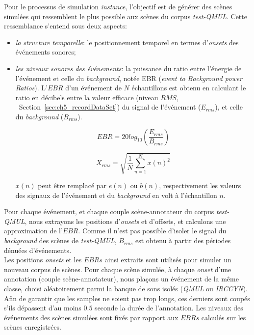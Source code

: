 Pour le processus de simulation \emph{instance}, l'objectif est de générer des scènes simulées qui ressemblent le plus possible aux scènes du corpus \emph{test-QMUL}. Cette ressemblance s'entend sous deux aspects:

\begin{itemize}
\item \emph{la structure temporelle}: le positionnement temporel en termes d'\emph{onsets} des événements sonores;
\item \emph{les niveaux sonores des événements}: la puissance du ratio entre l'énergie de l'événement et celle du \emph{background}, notée EBR (\emph{event to Background power Ratios}). L'$EBR$ d'un événement de $N$ échantillons est obtenu en calculant le ratio en décibels entre la valeur efficace (niveau $RMS$, \cf~Section~\ref{sec:ch5_recordDataSet}) du signal de l'événement ($E_{rms}$), et celle du \emph{background}  ($B_{rms}$).

\begin{equation}
\label{eq:ch7_eq1}
EBR=20log_{10} \left(  \dfrac{E_{rms}}{B_{rms}} \right) 
\end{equation}

\begin{equation}
\label{eq:ch7_eq2}
X_{rms}=\sqrt{\dfrac{1}{N} \sum_{n=1}^{N} x(n)^2}
\end{equation}

$x(n)$ peut être remplacé par $e(n)$ ou $b(n)$, respectivement les valeurs des signaux de l'événement et du \emph{background} en volt à l'échantillon $n$. 
\end{itemize}

Pour chaque événement, et chaque couple scène-annotateur du corpus \emph{test-QMUL}, nous extrayons les positions d'\emph{onsets} et d'{offsets}, et calculons une approximation de l'$EBR$. Comme il n'est pas possible d'isoler le signal du \emph{background} des scènes de \emph{test-QMUL}, $B_{rms}$ est obtenu à partir des périodes dénuées d'événements. \\
 

Les positions \emph{onsets} et les $EBRs$ ainsi extraits sont utilisés pour simuler un nouveau corpus de scènes. Pour chaque scène simulée, à chaque \emph{onset} d'une annotation (couple scène-annotateur), nous plaçons un événement de la même classe, choisi aléatoirement parmi la banque de sons isolés (\emph{QMUL} ou \emph{IRCCYN}). Afin de garantir que les samples ne soient pas trop longs, ces derniers sont coupés s'ils dépassent d'au moins $0.5$ seconde la durée de l'annotation. Les niveaux des événements des scènes simulées sont fixés par rapport aux $EBRs$ calculés sur les scènes enregistrées. 

